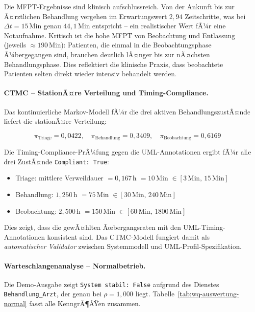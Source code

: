 ﻿\documentclass[a4paper,12pt]{scrreprt}
\theoremstyle{definition}
\begin{document}
Die MFPT-Ergebnisse sind klinisch aufschlussreich. Von der Ankunft bis zur
Ã¤rztlichen Behandlung vergehen im Erwartungswert $2{,}94$ Zeitschritte,
was bei $\Delta t = 15$\,Min genau $44{,}1$\,Min entspricht -- ein
realistischer Wert fÃ¼r eine Notaufnahme. Kritisch ist die hohe MFPT
von Beobachtung und Entlassung (jeweils $\approx 190$\,Min): Patienten,
die einmal in die Beobachtungsphase Ã¼bergegangen sind, brauchen
deutlich lÃ¤nger bis zur nÃ¤chsten Behandlungsphase. Dies reflektiert die
klinische Praxis, dass beobachtete Patienten selten direkt wieder intensiv
behandelt werden.

\paragraph{CTMC -- StationÃ¤re Verteilung und Timing-Compliance.}
Das kontinuierliche Markov-Modell fÃ¼r die drei aktiven BehandlungszustÃ¤nde
liefert die stationÃ¤re Verteilung:

\begin{equation}
	\pi_\text{Triage} = 0{,}0422, \quad
	\pi_\text{Behandlung} = 0{,}3409, \quad
	\pi_\text{Beobachtung} = 0{,}6169
\end{equation}

Die Timing-Compliance-PrÃ¼fung gegen die UML-Annotationen ergibt
fÃ¼r alle drei ZustÃ¤nde \texttt{Compliant: True}:
\begin{itemize}
	\item[-] Triage: mittlere Verweildauer $= 0{,}167$\,h $= 10$\,Min
	$\in [3\,\text{Min},\, 15\,\text{Min}]$ \checkmark
	\item[-] Behandlung: $1{,}250$\,h $= 75$\,Min
	$\in [30\,\text{Min},\, 240\,\text{Min}]$ \checkmark
	\item[-] Beobachtung: $2{,}500$\,h $= 150$\,Min
	$\in [60\,\text{Min},\, 1800\,\text{Min}]$ \checkmark
\end{itemize}

Dies zeigt, dass die gewÃ¤hlten Ãœbergangsraten mit den UML-Timing-Annotationen
konsistent sind. Das CTMC-Modell fungiert damit als \emph{automatischer
	Validator} zwischen Systemmodell und UML-Profil-Spezifikation.

\paragraph{Warteschlangenanalyse -- Normalbetrieb.}
Die Demo-Ausgabe zeigt \texttt{System \newline stabil: False} aufgrund des
Dienstes \texttt{Behandlung\_Arzt}, der genau bei $\rho = 1{,}000$ liegt.
Tabelle~\ref{tab:wq-auswertung-normal} fasst alle KenngrÃ¶ÃŸen zusammen.
\end{document}
